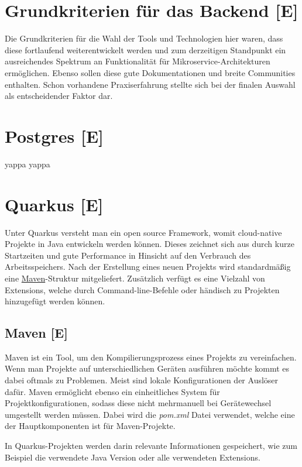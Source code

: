 \section{Grundkriterien für das Backend [E]}
Die Grundkriterien für die Wahl der Tools und Technologien hier waren, dass diese fortlaufend weiterentwickelt werden 
und zum derzeitigen Standpunkt ein ausreichendes Spektrum an Funktionalität für Mikroservice-Architekturen ermöglichen.\cite{MicroserviceAbout} 
Ebenso sollen diese gute Dokumentationen und breite Communities enthalten. Schon vorhandene Praxiserfahrung stellte sich bei der finalen Auswahl als entscheidender Faktor dar.

\section{Postgres [E]}
yappa yappa

\section{Quarkus [E]}
Unter Quarkus versteht man ein open source Framework, womit cloud-native Projekte in Java entwickeln werden können. 
Dieses zeichnet sich aus durch kurze Startzeiten und gute Performance in Hinsicht auf den Verbrauch des Arbeitsspeichers. 
Nach der Erstellung eines neuen Projekts wird standardmäßig eine \hyperref[ch::MavenTool]{Maven}-Struktur mitgeliefert.
Zusätzlich verfügt es eine Vielzahl von Extensions, welche durch Command-line-Befehle oder händisch zu Projekten hinzugefügt werden können.

\cite{QuarkusAbout, QuarkusFirstApplication}

\subsection{Maven [E]}
\label{ch::MavenTool}
Maven ist ein Tool, um den Kompilierungsprozess eines Projekts zu vereinfachen. 
Wenn man Projekte auf unterschiedlichen Geräten ausführen möchte kommt es dabei oftmals zu Problemen. Meist sind lokale Konfigurationen der Auslöser dafür.
Maven ermöglicht ebenso ein einheitliches System für Projektkonfigurationen, sodass diese nicht mehrmanuell bei Gerätewechsel umgestellt werden müssen. 
Dabei wird die \emph{pom.xml} Datei verwendet, welche eine der Hauptkomponenten ist für Maven-Projekte.
\cite{MavenAbout}

In Quarkus-Projekten werden darin relevante Informationen gespeichert, wie zum Beispiel die verwendete Java Version oder alle verwendeten Extensions.
\

